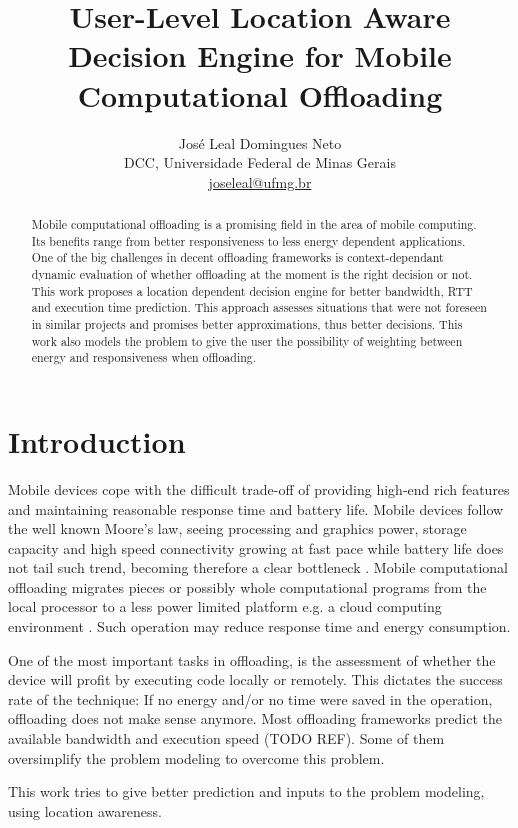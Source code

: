 \documentclass[10pt, conference, letterpaper]{IEEEtran}
\title{User-Level Location Aware Decision Engine for Mobile Computational Offloading}
\author{José Leal Domingues Neto \\ DCC, Universidade Federal de Minas Gerais \\ \href{mailto:joseleal@ufmg.br}{joseleal@ufmg.br}}
\begin{document}
\maketitle

\begin{abstract}
  Mobile computational offloading is a promising field in the area of mobile computing. Its benefits range from better responsiveness to less energy dependent applications. One of the big challenges in decent offloading frameworks is context-dependant dynamic evaluation of whether offloading at the moment is the right decision or not. This work proposes a location dependent decision engine for better bandwidth, RTT and execution time prediction. This approach assesses situations that were not foreseen in similar projects and promises better approximations, thus better decisions. This work also models the problem to give the user the possibility of weighting between energy and responsiveness when offloading.
\end{abstract}

\section{Introduction}
  Mobile devices cope with the difficult trade-off of providing high-end rich features and maintaining reasonable response time and battery life. Mobile devices follow the well known Moore's law, seeing processing and graphics power, storage capacity and high speed connectivity growing at fast pace while battery life does not tail such trend, becoming therefore a clear bottleneck \cite{Cuervo:2010:MMS:1814433.1814441}. Mobile computational offloading migrates pieces or possibly whole computational programs from the local processor to a less power limited platform e.g. a cloud computing environment \cite{Scavenger:5466972}. Such operation may reduce response time and energy consumption.  

  One of the most important tasks in offloading, is the assessment of whether the device will profit by executing code locally or remotely. This dictates the success rate of the technique: If no energy and/or no time were saved in the operation, offloading does not make sense anymore. Most offloading frameworks predict the available bandwidth and execution speed (TODO REF). Some of them oversimplify the problem modeling to overcome this problem.
  
  This work tries to give better prediction and inputs to the problem modeling, using location awareness.
  
\end{document}
